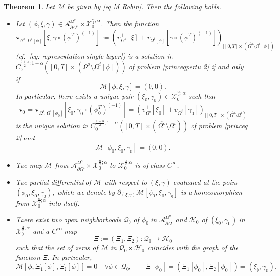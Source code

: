 \documentclass[11pt,reqno,a4paper]{amsart}
\theoremstyle{plain}
\newtheorem{theorem}{Theorem}[section]
\theoremstyle{definition}
\begin{document}
\begin{theorem}\label{sec 4: thm recall}
Let $\mathcal{M}$ be given by \eqref{eq M Robin}. Then the following holds.
\begin{itemize}
    \item[(i)] Let $(\phi, \xi,\gamma) \in \mathcal{A}^{\Omega^o}_{\partial\Omega^i} \times \mathcal{X}_0^{\frac{\alpha}{2}; \alpha}$. Then the function
    \begin{equation*}
        \mathbf{v}_{\Omega^o,\Omega^i[\phi]}\left[\xi,\gamma \circ (\phi^T)^{(-1)} \right] := \left( v^+_{\Omega^o} [\xi] + v^-_{\Omega^i[\phi]} \left[\gamma\circ (\phi^T)^{(-1)}\right] \right)_{| [0,T] \times (\overline{\Omega^o} \setminus {\Omega^i[\phi]})}
    \end{equation*}
    (cf.\, \eqref{eq: representation single layer}) is a solution in $C_{0}^{\frac{1+\alpha}{2}; 1+\alpha}([0,T] \times (\overline{\Omega^o} \setminus \Omega^i[\phi]))$ of problem \eqref{princeqpertu 2} if and only if 
    \begin{equation*}
        \mathcal{M}[\phi,\xi,\gamma] = (0,0).
    \end{equation*}
    In particular, there exists a unique pair $(\xi_0,\gamma_0) \in \mathcal{X}_0^{\frac{\alpha}{2}; \alpha}$ such that 
    \[
    \mathbf{v}_0 =  \mathbf{v}_{\Omega^o,\Omega^i[\phi_0]}\left[\xi_0,\gamma_0 \circ (\phi_0^T)^{(-1)} \right] = \left( v^+_{\Omega^o} [\xi_0] + v^-_{\Omega^i} [\gamma_0] \right)_{| [0,T] \times (\overline{\Omega^o} \setminus {\Omega^i})}
    \]
    is the unique solution in $C_{0}^{\frac{1+\alpha}{2}; 1+\alpha}([0,T] \times (\overline{\Omega^o} \setminus \Omega^i))$ of problem \eqref{princeq 2} and 
    \[
    \mathcal{M}[\phi_0,\xi_0,\gamma_0] = (0,0).
    \]

    \item[(ii)] The map $\mathcal{M}$ from $\mathcal{A}^{\Omega^o}_{\partial\Omega^i} \times \mathcal{X}_0^{\frac{\alpha}{2}; \alpha}$ to $\mathcal{X}_0^{\frac{\alpha}{2}; \alpha}$ is of class $C^{\infty}$.

    \item[(iii)] The partial differential of $\mathcal{M}$ with respect to $(\xi,\gamma)$ evaluated at the point $(\phi_0,\xi_0,\gamma_0)$, which we denote by $\partial_{(\xi,\gamma)}\mathcal{M}[\phi_0,\xi_0,\gamma_0]$ is a homeomorphism from $\mathcal{X}_0^{\frac{\alpha}{2}; \alpha}$ into itself.

    \item[(iv)] There exist two open neighborhoods $\mathcal{Q}_0$ of $\phi_0$ in $\mathcal{A}^{\Omega^o}_{\partial\Omega^i}$ and $\mathcal{H}_0$ of $(\xi_0,\gamma_0)$ in $\mathcal{X}_0^{\frac{\alpha}{2}; \alpha}$ and a $C^{\infty}$ map 
    \[
    \Xi := (\Xi_1,\Xi_2): \mathcal{Q}_0 \to \mathcal{H}_0
    \]
    such that the set of zeros of $\mathcal{M}$ in $\mathcal{Q}_0 \times \mathcal{H}_0$ coincides with the graph of the function $\Xi$. In particular,
    \begin{equation*}
    \mathcal{M}[\phi, \Xi_1[\phi],\Xi_2[\phi]] = 0  \quad \forall\phi \in \mathcal{Q}_0, \qquad  \Xi[\phi_0]= (\Xi_1[\phi_0],\Xi_2[\phi_0])= (\xi_0,\gamma_0).
    \end{equation*}


\end{itemize}
\end{theorem}
\end{document}
